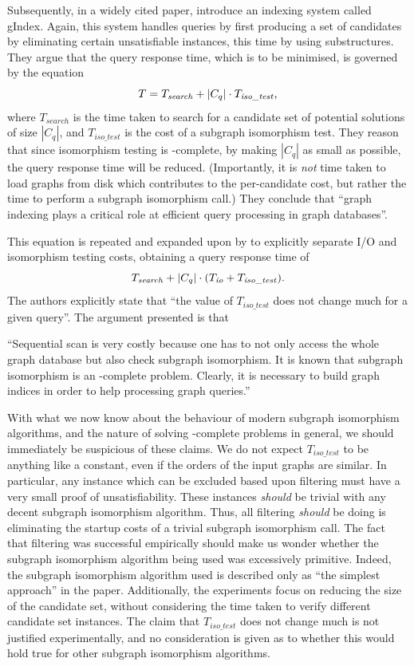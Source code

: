 \documentclass[twoside,11pt]{article}
\newcommand{\citet}[1]{\citeA{#1}}
\begin{document}
Subsequently, in a widely cited paper, \citet{DBLP:conf/sigmod/YanYH04} introduce an indexing system
called gIndex. Again, this system handles queries by first producing a set of candidates by
eliminating certain unsatisfiable instances, this time by using substructures. They argue that the
query response time, which is to be minimised, is governed by the equation \[ T =
T_{\mathit{search}} + \left|C_q\right| \cdot T_{\mathit{iso\_test}} \textnormal{,}\] where
$T_{\mathit{search}}$ is the time taken to search for a candidate set of potential solutions of size
$\left|C_q\right|$, and $T_{\mathit{iso\_test}}$ is the cost of a subgraph isomorphism test. They
reason that since isomorphism testing is \NP-complete, by making $\left|C_q\right|$ as small as
possible, the query response time will be reduced.  (Importantly, it is \emph{not} time taken to
load graphs from disk which contributes to the per-candidate cost, but rather the time to perform a
subgraph isomorphism call.) They conclude that ``graph indexing plays a critical role at efficient
query processing in graph databases''.

This equation is repeated and expanded upon by \citet{DBLP:journals/tods/YanYH05} to explicitly
separate I/O and isomorphism testing costs, obtaining a query response time of \[
    T_{\mathit{search}} + \left|C_q\right| \cdot (T_{\mathit{io}} + T_{\mathit{iso\_test}})
    \textnormal{.} \] The authors explicitly state that ``the value of $T_{\mathit{iso\_test}}$ does
not change much for a given query''. The argument presented is that
\begin{displayquote}``Sequential scan is very costly
because one has to not only access the whole graph database but also check subgraph isomorphism. It
is known that subgraph isomorphism is an \NP-complete problem. Clearly, it is necessary to build
graph indices in order to help processing graph queries.''\end{displayquote}
With what we now know about the behaviour of modern subgraph isomorphism algorithms, and the nature
of solving \NP-complete problems in general, we should immediately be suspicious of these claims. We
do not expect $T_{\mathit{iso\_test}}$ to be anything like a constant, even if the orders of the
input graphs are similar. In particular, any instance which can be excluded based upon filtering
must have a very small proof of unsatisfiability. These instances \emph{should} be trivial with any
decent subgraph isomorphism algorithm. Thus, all filtering \emph{should} be doing is eliminating the startup
costs of a trivial subgraph isomorphism call. The fact that filtering was successful empirically
should make us wonder whether the subgraph isomorphism algorithm being used was excessively
primitive. Indeed, the subgraph isomorphism algorithm used is described only as ``the simplest approach'' in the
paper.  Additionally, the experiments focus on reducing the size of the candidate set, without
considering the time taken to verify different candidate set instances.  The claim that
$T_{\mathit{iso\_test}}$ does not change much is not justified experimentally, and no consideration
is given as to whether this would hold true for other subgraph isomorphism algorithms.
\end{document}
